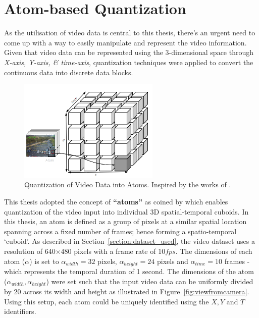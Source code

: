 \section{Atom-based Quantization}
\label{section:atoms}

As the utilisation of video data is central to this thesis, there's an urgent need to come up with a way to easily manipulate and represent the video information. Given that video data can be represented using the 3-dimensional space through \textit{X-axis, Y-axis, \& time-axis}, quantization techniques were applied to convert the continuous data into discrete data blocks.


\begin{figure}[H]\centering
\includegraphics[width=0.6\textwidth]{image/general/atom.PNG}
\caption[Quantization of Video Data into Atoms.]
{Quantization of Video Data into Atoms.
Inspired by the works of .}
\label{fig:atoms}
\end{figure}


This thesis adopted the concept of \textbf{``atoms''} as coined by \cite{castanon2016retrieval} which enables quantization of the video input into individual 3D spatial-temporal cuboids. In this thesis, an atom is defined as a group of pixels at a similar spatial location spanning across a fixed number of frames; hence forming a spatio-temporal `cuboid'.
As described in Section~\ref{section:dataset_used}, the video dataset uses a resolution of 640$\times$480 pixels with a frame rate of 10$fps$.
The dimensions of each atom ($\alpha$) is set to $\alpha_{width}=32$ pixels, $\alpha_{height}=24$ pixels and $\alpha_{time}=10$ frames - which represents the temporal duration of 1 second.
The dimensions of the atom ($\alpha_{width},\alpha_{height}$) were set such that the input video data can be uniformly divided by 20 across its width and height as illustrated in Figure~\ref{fig:viewfromcamera}. Using this setup, each atom could be uniquely identified using the $X, Y$ and $T$ identifiers.

